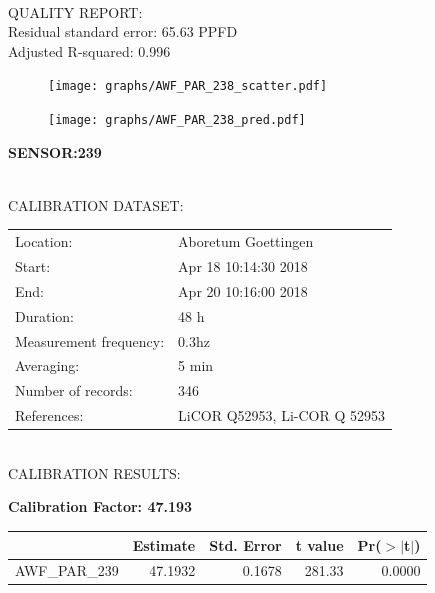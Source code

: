 \documentclass[oneside]{report}
\begin{document}
\hrulefill\\
QUALITY REPORT:\\
Residual standard error: 65.63 PPFD\\
Adjusted R-squared: 0.996



\begin{figure}[H]
  \centering
  \texttt{[image: graphs/AWF\_PAR\_238\_scatter.pdf]}
\end{figure}




\begin{figure}[H]
  \centering
  \texttt{[image: graphs/AWF\_PAR\_238\_pred.pdf]}
\end{figure}

\pagebreak


\begin{center}
\large{\textbf{SENSOR:239}}\\
\end{center}

\hrulefill\\
CALIBRATION DATASET:\\
\begin{table}[h!]
  \centering
  \label{tab:table1}
  \begin{tabular}{ll}
    Location: & Aboretum Goettingen\\ 
    
    
    Start:  & Apr 18 10:14:30 2018 \\
    End:   & Apr 20 10:16:00 2018\\ 
    Duration: & 48 h\\
    Measurement frequency: & 0.3hz\\
    Averaging:  &5 min\\
    Number of records: & 346 \\
    References: & LiCOR Q52953, Li-COR Q 52953 \\
  \end{tabular}
\end{table}

\hrulefill\\
CALIBRATION RESULTS:\\


\begin{center}
\textbf{\large{Calibration Factor: 47.193}}\\
\end{center}
\begin{table}[ht]
\centering
\begin{tabular}{rrrrr}
  \hline
 & Estimate & Std. Error & t value & Pr($>$$|$t$|$) \\ 
  \hline
AWF\_PAR\_239 & 47.1932 & 0.1678 & 281.33 & 0.0000 \\ 
   \hline
\end{tabular}
\end{table}
\end{document}
